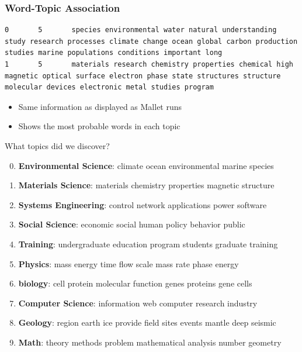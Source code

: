 \begin{frame}[fragile]
  \frametitle{Word-Topic Association}
  \begin{lstlisting}
0       5       species environmental water natural understanding study research processes climate change ocean global carbon production studies marine populations conditions important long 
1       5       materials research chemistry properties chemical high magnetic optical surface electron phase state structures structure molecular devices electronic metal studies program 
    \end{lstlisting}

    \begin{itemize}
      \item Same information as displayed as Mallet runs
        \item Shows the most probable words in each topic
      \end{itemize}

\end{frame}


\begin{frame}{What topics did we discover?}
\small
  \begin{enumerate}
    \setcounter{enumi}{-1}
    \item {\bf Environmental Science}: climate ocean environmental marine species
    \item {\bf Materials Science}: materials chemistry properties magnetic structure
    \item {\bf Systems Engineering}: control network applications power software
    \item {\bf Social Science}: economic social human policy behavior public
    \item {\bf Training}: undergraduate education program students graduate training
    \item {\bf Physics}: mass energy time flow scale mass rate phase energy
    \item {\bf biology}: cell protein molecular function genes proteins gene cells
    \item {\bf Computer Science}: information web computer research industry
    \item {\bf Geology}: region earth ice provide field sites events mantle deep seismic 
    \item {\bf Math}: theory methods problem mathematical analysis number geometry
    \end{enumerate}
\end{frame}

